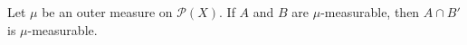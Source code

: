 Let $\mu$ be an outer measure on $\mathcal{P}(X)$. If $A$ and $B$ are $\mu$-measurable, then $A \cap B'$ is $\mu$-measurable.